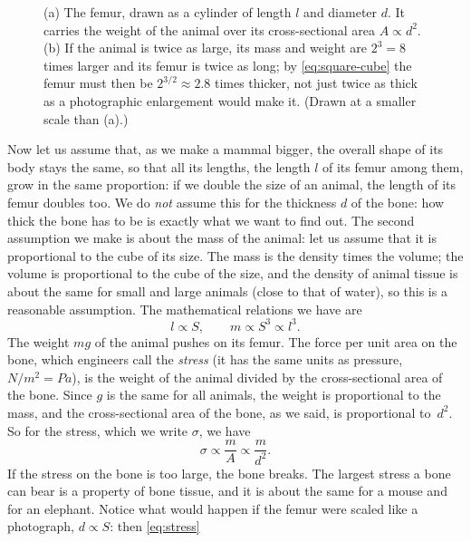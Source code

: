 \documentclass[11pt,a4paper]{article}
\begin{document}
\begin{figure}[htb]
\caption{(a) The femur, drawn as a cylinder of length $l$ and diameter $d$. It carries the weight
of the animal over its cross-sectional area $A \propto d^2$. (b) If the animal is twice as large,
its mass and weight are $2^3 = 8$ times larger and its femur is twice as long; by
\eqref{eq:square-cube} the femur must then be $2^{3/2}\approx 2.8$ times thicker, not just twice
as thick as a photographic enlargement would make it. (Drawn at a smaller scale than (a).)}
\label{fig:femur}
\end{figure}

Now let us assume that, as we make a mammal bigger, the overall shape of its body stays the same,
so that all its lengths, the length $l$ of its femur among them, grow in the same proportion: if
we double the size of an animal, the length of its femur doubles too. We do \emph{not} assume this
for the thickness $d$ of the bone: how thick the bone has to be is exactly what we want to find
out. The second assumption we make is about the mass of the animal: let us assume
that it is proportional to the cube of its size. The mass is the density times the volume; the
volume is proportional to the cube of the size, and the density of animal tissue is about the same
for small and large animals (close to that of water), so this is a reasonable assumption. The
mathematical relations we have are
\begin{equation}\label{eq:scaling}
  l \propto S , \qquad m \propto S^3 \propto l^3 .
\end{equation}
The weight $mg$ of the animal pushes on its femur. The force per unit area on the bone, which
engineers call the \emph{stress} (it has the same units as pressure, $\unit{N/m^2} = \unit{Pa}$),
is the weight of the animal divided by the cross-sectional area of the bone. Since $g$ is the same
for all animals, the weight is proportional to the mass, and the cross-sectional area of the bone,
as we said, is proportional to~$d^2$. So for the stress, which we write $\sigma$, we have
\begin{equation}\label{eq:stress}
  \sigma \propto \frac{m}{A} \propto \frac{m}{d^2} .
\end{equation}
If the stress on the bone is too large, the bone breaks. The largest stress a bone can bear is a
property of bone tissue, and it is about the same for a mouse and for an elephant. Notice what
would happen if the femur were scaled like a photograph, $d \propto S$: then \eqref{eq:stress}
\end{document}
